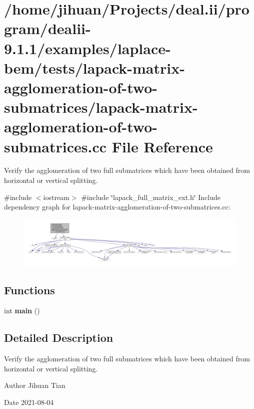 \hypertarget{lapack-matrix-agglomeration-of-two-submatrices_8cc}{}\section{/home/jihuan/\+Projects/deal.ii/program/dealii-\/9.1.1/examples/laplace-\/bem/tests/lapack-\/matrix-\/agglomeration-\/of-\/two-\/submatrices/lapack-\/matrix-\/agglomeration-\/of-\/two-\/submatrices.cc File Reference}
\label{lapack-matrix-agglomeration-of-two-submatrices_8cc}


Verify the agglomeration of two full submatrices which have been obtained from horizontal or vertical splitting.  


{\ttfamily \#include $<$iostream$>$}\newline
{\ttfamily \#include \char`\"{}lapack\+\_\+full\+\_\+matrix\+\_\+ext.\+h\char`\"{}}\newline
Include dependency graph for lapack-\/matrix-\/agglomeration-\/of-\/two-\/submatrices.cc\+:
\nopagebreak
\begin{figure}[H]
\begin{center}
\leavevmode
\includegraphics[width=350pt]{lapack-matrix-agglomeration-of-two-submatrices_8cc__incl}
\end{center}
\end{figure}
\subsection*{Functions}
\begin{DoxyCompactItemize}
\item 
\mbox{\label{lapack-matrix-agglomeration-of-two-submatrices_8cc_ae66f6b31b5ad750f1fe042a706a4e3d4}} 
int {\bfseries main} ()
\end{DoxyCompactItemize}


\subsection{Detailed Description}
Verify the agglomeration of two full submatrices which have been obtained from horizontal or vertical splitting. 

\begin{DoxyAuthor}{Author}
Jihuan Tian 
\end{DoxyAuthor}
\begin{DoxyDate}{Date}
2021-\/08-\/04 
\end{DoxyDate}
